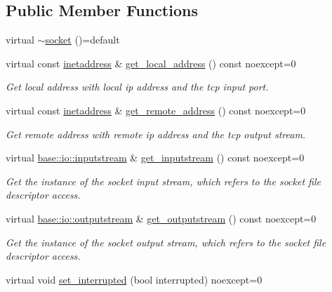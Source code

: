\subsection*{Public Member Functions}
\begin{DoxyCompactItemize}
\item 
virtual \hyperlink{structdevfix_1_1net_1_1socket_ad9d4d9643894e213faefd4e37938f1fe}{$\sim$socket} ()=default
\item 
virtual const \hyperlink{structdevfix_1_1net_1_1inetaddress}{inetaddress} \& \hyperlink{structdevfix_1_1net_1_1socket_a570b728ca81a3d47ca7733ff21063318}{get\+\_\+local\+\_\+address} () const noexcept=0
\begin{DoxyCompactList}\small\item\em Get local address with local ip address and the tcp input port. \end{DoxyCompactList}\item 
virtual const \hyperlink{structdevfix_1_1net_1_1inetaddress}{inetaddress} \& \hyperlink{structdevfix_1_1net_1_1socket_afb69dcc8da66eb15a927d031f50a4ba2}{get\+\_\+remote\+\_\+address} () const noexcept=0
\begin{DoxyCompactList}\small\item\em Get remote address with remote ip address and the tcp output stream. \end{DoxyCompactList}\item 
virtual \hyperlink{structdevfix_1_1base_1_1io_1_1inputstream}{base\+::io\+::inputstream} \& \hyperlink{structdevfix_1_1net_1_1socket_a3a00115497ccb83e8497a7e33be06b03}{get\+\_\+inputstream} () const noexcept=0
\begin{DoxyCompactList}\small\item\em Get the instance of the socket input stream, which refers to the socket file descriptor access. \end{DoxyCompactList}\item 
virtual \hyperlink{structdevfix_1_1base_1_1io_1_1outputstream}{base\+::io\+::outputstream} \& \hyperlink{structdevfix_1_1net_1_1socket_ac0320fa786f14778a3a1e2796d9dce57}{get\+\_\+outputstream} () const noexcept=0
\begin{DoxyCompactList}\small\item\em Get the instance of the socket output stream, which refers to the socket file descriptor access. \end{DoxyCompactList}\item 
virtual void \hyperlink{structdevfix_1_1net_1_1socket_a3fa8d7dcd44e7740b29ad6674005eb5d}{set\+\_\+interrupted} (bool interrupted) noexcept=0

\end{DoxyCompactItemize}
